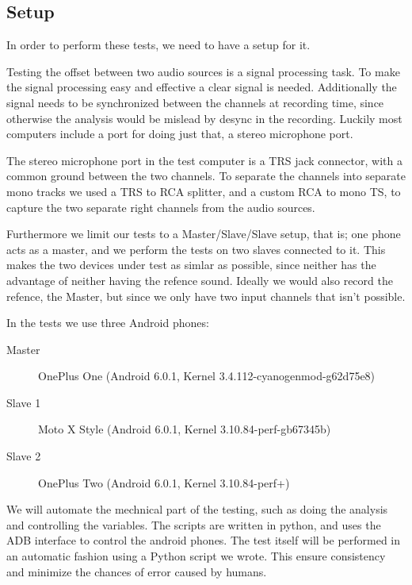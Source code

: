 \subsection{Setup}
In order to perform these tests, we need to have a setup for it. 

Testing the offset between two audio sources is a signal processing
task. To make the signal processing easy and effective a clear signal is
needed. Additionally the signal needs to be synchronized between the
channels at recording time, since otherwise the analysis would be
mislead by desync in the recording. Luckily most computers include
a port for doing just that, a stereo microphone port.

The stereo microphone port in the test computer is a \ac{TRS} jack
connector, with a common ground between the two channels. To separate
the channels into separate mono tracks we used a \ac{TRS} to \ac{RCA}
splitter, and a custom \ac{RCA} to mono \ac{TS}, to capture the two
separate right channels from the audio sources.

Furthermore we limit our tests to a Master/Slave/Slave setup, that is;
one phone acts as a master, and we perform the tests on two slaves
connected to it. This makes the two devices under test as simlar as
possible, since neither has the advantage of neither having the refence
sound. Ideally we would also record the refence, the Master, but since
we only have two input channels that isn't possible.

In the tests we use three Android phones:
\begin{description}
	\item[Master]{OnePlus One (Android 6.0.1, Kernel 3.4.112-cyanogenmod-g62d75e8)}
	\item[Slave 1]{Moto X Style (Android 6.0.1, Kernel 3.10.84-perf-gb67345b)}
	\item[Slave 2]{OnePlus Two (Android 6.0.1, Kernel 3.10.84-perf+)}
\end{description}

We will automate the mechnical part of the testing, such as doing the
analysis and controlling the variables. The scripts are written in
python, and uses the \ac{ADB} interface to control the android phones.
The test itself will be performed in an automatic fashion using a Python script
we wrote.  This ensure consistency and minimize the chances of error caused by
humans.
